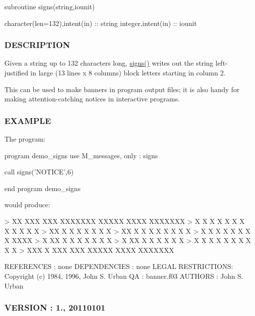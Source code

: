 \begin{DoxyVerb} subroutine signs(string,iounit)

  character(len=132),intent(in)  :: string
  integer,intent(in)             :: iounit
\end{DoxyVerb}


\subsubsection*{D\+E\+S\+C\+R\+I\+P\+T\+I\+ON}

Given a string up to 132 characters long, \hyperlink{namespacem__messages_a239cb1269cc27d45176b9a278276d399}{signs()} writes out the string left-\/justified in large (13 lines x 8 columns) block letters starting in column 2.

This can be used to make banners in program output files; it is also handy for making attention-\/catching notices in interactive programs.

\subsubsection*{E\+X\+A\+M\+P\+LE}

\begin{DoxyVerb} The program:

    program demo_signs
    use M_messages, only : signs

    call signs('NOTICE',6)

    end program demo_signs

 would produce:

  > XX  XXX   XXX   XXXXXXX  XXXXX    XXXX  XXXXXXX
  >  X   X   X   X  X  X  X    X     X    X  X    X
  >  XX  X  X     X    X       X    X        X
  >  XX  X  X     X    X       X    X        X  X
  >  X X X  X     X    X       X    X        XXXX
  >  X  XX  X     X    X       X    X        X  X
  >  X  XX  X     X    X       X    X        X
  >  X   X   X   X     X       X     X    X  X    X
  > XXX  X    XXX     XXX    XXXXX    XXXX  XXXXXXX \end{DoxyVerb}


R\+E\+F\+E\+R\+E\+N\+C\+ES \+: none D\+E\+P\+E\+N\+D\+E\+N\+C\+I\+ES \+: none L\+E\+G\+AL R\+E\+S\+T\+R\+I\+C\+T\+I\+O\+NS\+: Copyright (c) 1984, 1996, John S. Urban QA \+: banner.\+f03 A\+U\+T\+H\+O\+RS \+: John S. Urban \subsubsection*{V\+E\+R\+S\+I\+ON \+: 1., 20110101}\mbox{\label{namespacem__messages_acc516fb8a4dd9eede3abb535ff7496e0}} 
